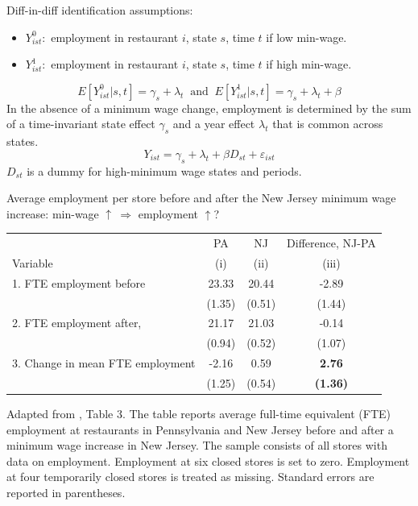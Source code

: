 \documentclass{beamer}
\begin{document}
\begin{frame}{\cite{card1994minimum}}
Diff-in-diff identification assumptions:
\begin{itemize}
\item $Y^0_{ist}:$  employment in restaurant $i$, state $s$, time $t$ if low min-wage.
\item $Y^1_{ist}:$ employment in restaurant $i$, state $s$, time $t$ if high min-wage.
\end{itemize}
\[E[Y^0_{ist}|s,t]=\gamma_s+\lambda_t \ \text{ and }\ E[Y^1_{ist}|s,t]=\gamma_s+\lambda_t+\beta \]
In the absence of a minimum wage change, employment is determined
by the sum of a time-invariant state effect $\gamma_s$ and a year effect $\lambda_t$ that is common across states.
\[Y_{ist}=\gamma_s+\lambda_t+\beta D_{st}+\varepsilon_{ist} \]
$D_{st}$ is a dummy for high-minimum wage states and periods.
\end{frame}

\begin{frame}{\cite{card1994minimum}}
Average employment per store before and after the New Jersey minimum wage increase: min-wage $\uparrow \ \Rightarrow$ employment $\uparrow$?
\footnotesize
\begin{table}
\centering
\begin{tabular}{lccc}
\hline\hline
&PA &NJ &Difference, NJ-PA\\
Variable& (i) &(ii) &(iii)\\
\hline
1. FTE employment before& 23.33& 20.44& -2.89\\
& (1.35)&(0.51)& (1.44)\\
2. FTE employment after,& 21.17& 21.03& -0.14\\
& (0.94) &(0.52) &(1.07)\\
3. Change in mean FTE employment &-2.16& 0.59& \textbf{2.76}\\
&(1.25) &(0.54)& \textbf{(1.36)}\\
\hline\hline
\end{tabular}
\end{table}

Adapted from \cite{card1994minimum}, Table 3. The
table reports average full-time equivalent (FTE) employment at
restaurants in Pennsylvania and New Jersey before and after a
minimum wage increase in New Jersey. The sample consists of
all stores with data on employment. Employment at six closed
stores is set to zero. Employment at four temporarily closed stores
is treated as missing. Standard errors are reported in parentheses.
\end{frame}
\end{document}

